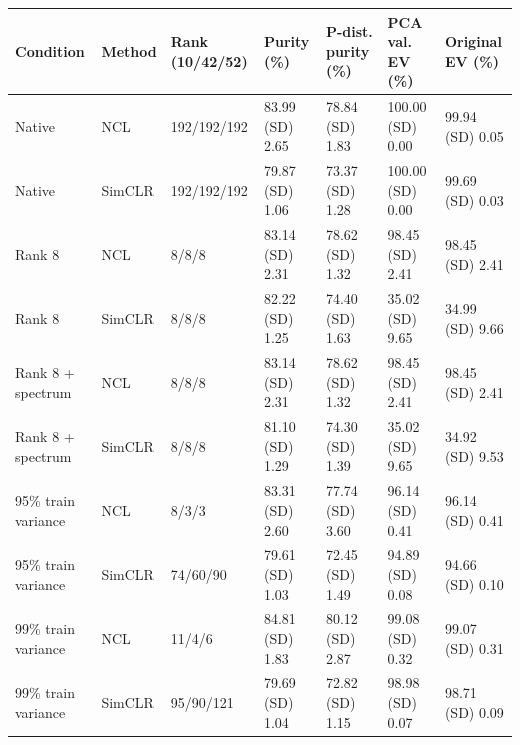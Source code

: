 \begin{tabular}{lllllll}
\toprule
Condition & Method & Rank (10/42/52) & Purity (\%) & P-dist. purity (\%) & PCA val. EV (\%) & Original EV (\%) \\
\midrule
Native & NCL & 192/192/192 & 83.99 (SD) 2.65 & 78.84 (SD) 1.83 & 100.00 (SD) 0.00 & 99.94 (SD) 0.05 \\
Native & SimCLR & 192/192/192 & 79.87 (SD) 1.06 & 73.37 (SD) 1.28 & 100.00 (SD) 0.00 & 99.69 (SD) 0.03 \\
Rank 8 & NCL & 8/8/8 & 83.14 (SD) 2.31 & 78.62 (SD) 1.32 & 98.45 (SD) 2.41 & 98.45 (SD) 2.41 \\
Rank 8 & SimCLR & 8/8/8 & 82.22 (SD) 1.25 & 74.40 (SD) 1.63 & 35.02 (SD) 9.65 & 34.99 (SD) 9.66 \\
Rank 8 + spectrum & NCL & 8/8/8 & 83.14 (SD) 2.31 & 78.62 (SD) 1.32 & 98.45 (SD) 2.41 & 98.45 (SD) 2.41 \\
Rank 8 + spectrum & SimCLR & 8/8/8 & 81.10 (SD) 1.29 & 74.30 (SD) 1.39 & 35.02 (SD) 9.65 & 34.92 (SD) 9.53 \\
95\% train variance & NCL & 8/3/3 & 83.31 (SD) 2.60 & 77.74 (SD) 3.60 & 96.14 (SD) 0.41 & 96.14 (SD) 0.41 \\
95\% train variance & SimCLR & 74/60/90 & 79.61 (SD) 1.03 & 72.45 (SD) 1.49 & 94.89 (SD) 0.08 & 94.66 (SD) 0.10 \\
99\% train variance & NCL & 11/4/6 & 84.81 (SD) 1.83 & 80.12 (SD) 2.87 & 99.08 (SD) 0.32 & 99.07 (SD) 0.31 \\
99\% train variance & SimCLR & 95/90/121 & 79.69 (SD) 1.04 & 72.82 (SD) 1.15 & 98.98 (SD) 0.07 & 98.71 (SD) 0.09 \\
\bottomrule
\end{tabular}
